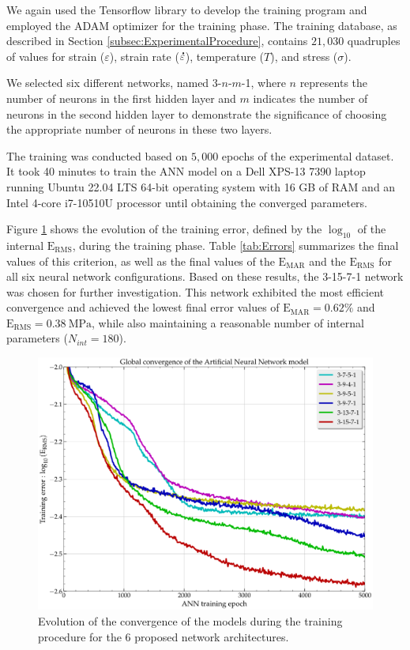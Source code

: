 \documentclass[metals,article,submit,pdftex,moreauthors]{Definitions/mdpi}
\DeclareRobustCommand{\mdot}[1]{\accentset{\mbox{\bfseries .}}{#1}}
\DeclareRobustCommand{\RMSE}{\text{E}_\text{RMS}}
\DeclareRobustCommand{\MARE}{\text{E}_\text{MAR}}
\DeclareRobustCommand{\MPa}{\text{MPa}}
\begin{document}
We again used the Tensorflow library to develop the training program and employed the ADAM optimizer for the training phase.
The training database, as described in Section \ref{subsec:ExperimentalProcedure}, contains $21,030$ quadruples of values for strain ($\varepsilon$), strain rate ($\mdot\varepsilon$), temperature ($T$), and stress ($\sigma$).

We selected six different networks, named 3-$n$-$m$-1, where $n$ represents the number of neurons in the first hidden layer and $m$ indicates the number of neurons in the second hidden layer to demonstrate the significance of choosing the appropriate number of neurons in these two layers.

The training was conducted based on $5,000$ epochs of the experimental dataset.
It took 40 minutes to train the ANN model on a Dell XPS-13 7390 laptop running Ubuntu 22.04 LTS 64-bit operating system with 16 GB of RAM and an Intel 4-core i7-10510U processor until obtaining the converged parameters.

Figure \ref{fig:ANN-conv} shows the evolution of the training error, defined by the $\log_{10}$ of the internal $\RMSE$, during the training phase.
Table \ref{tab:Errors} summarizes the final values of this criterion, as well as the final values of the $\MARE$ and the $\RMSE$ for all six neural network configurations.
Based on these results, the 3-15-7-1 network was chosen for further investigation. 
This network exhibited the most efficient convergence and achieved the lowest final error values of $\MARE=0.62\%$ and $\RMSE=0.38~\MPa$, while also maintaining a reasonable number of internal parameters ($N_{int}=180$).

\begin{figure}[H]
\centering
\includegraphics[width=0.7\columnwidth]{Figures/Conv-ANN-6}
\caption{Evolution of the convergence of the models during the training procedure for the 6 proposed network architectures.}
\label{fig:ANN-conv}
\end{figure}
\end{document}
